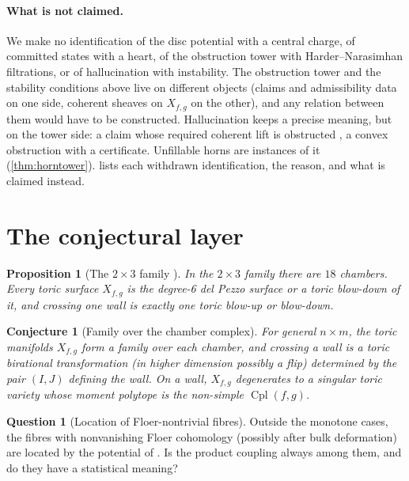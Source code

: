 \documentclass[11pt]{article}
\newtheorem{proposition}[theorem]{Proposition}
\newtheorem{conjecture}[theorem]{Conjecture}
\theoremstyle{definition}
\newtheorem{question}[theorem]{Question}
\theoremstyle{remark}
\newcommand{\Cpl}{\operatorname{Cpl}}
\begin{document}
\paragraph{What is not claimed.} We make no identification of the disc potential with a central
charge, of committed states with a heart, of the obstruction tower with Harder--Narasimhan filtrations,
or of hallucination with instability. The obstruction tower and the stability conditions above live
on different objects (claims and admissibility data on one side, coherent sheaves on $X_{f,g}$ on the
other), and any relation between them would have to be constructed. Hallucination keeps a precise meaning,
but on the tower side: a claim whose required coherent lift is obstructed \cite[Def.~10.17]{Awasthi-Tower}, a convex
obstruction with a certificate. Unfillable horns are instances of it (\cref{thm:horntower}). 
lists each withdrawn identification, the reason, and what is claimed instead.

\section{The conjectural layer}\label{sec:conjectural}

\begin{proposition}[The $2\times3$ family {\cite[\S3]{Awasthi-Family}}]\label{prop:family23}
In the $2\times3$ family there are $18$ chambers. Every toric surface $X_{f,g}$ is the degree-6 del Pezzo surface or a
toric blow-down of it, and crossing one wall is exactly one toric blow-up or blow-down.
\end{proposition}

\begin{conjecture}[Family over the chamber complex]\label{conj:family}
For general $n\times m$, the toric manifolds $X_{f,g}$ form a family over each chamber, and crossing a wall is a toric
birational transformation (in higher dimension possibly a flip) determined by the pair $(I,J)$ defining the wall. On a
wall, $X_{f,g}$ degenerates to a singular toric variety whose moment polytope is the non-simple $\Cpl(f,g)$.
\end{conjecture}

\begin{question}[Location of Floer-nontrivial fibres]\label{q:location}
Outside the monotone cases, the fibres with nonvanishing Floer cohomology (possibly after bulk
deformation) are located by the potential of \cite{FOOO2010}. Is the product coupling always among
them, and do they have a statistical meaning?
\end{question}
\end{document}
